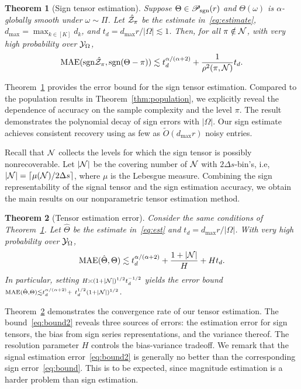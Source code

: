 \documentclass{article}
\theoremstyle{plain}
\newtheorem{thm}{Theorem}
\theoremstyle{definition}
\def\sign{\textup{sgn}}
\def\caliP{\mathscr{P}_{\textup{sgn}}}
\begin{document}
 \begin{thm}[Sign tensor estimation]\label{thm:classification} Suppose $\Theta\in\caliP(r)$ and $\Theta(\omega)$ is $\alpha$-globally smooth under $\omega\sim \Pi$. Let $\hat {\mathcal{Z}}_\pi$ be the estimate in~\eqref{eq:estimate}, $d_{\max}=\max_{k\in[K]} d_k$, and $t_d =d_{\max}r/|\Omega|\lesssim 1$. Then, for all $\pi\notin\mathcal{N}$, with very high probability over $\mathcal{Y}_\Omega$, 
\begin{align}\label{eq:bound}
\textup{MAE}(\sign \hat \tZ_\pi, \sign(\Theta-\pi)) \lesssim t_d^{\alpha/( \alpha+2)}+{1 \over \rho^2(\pi, \tN)}t_d.
\end{align}
\end{thm}
Theorem~\ref{thm:classification} provides the error bound for the sign tensor estimation. Compared to the population results in Theorem~\ref{thm:population}, we explicitly reveal the dependence of accuracy on the sample complexity and the level $\pi$. The result demonstrates the polynomial decay of sign errors with $|\Omega|$.  Our sign estimate achieves consistent recovery using as few as $\tilde O(d_{\max}r)$ noisy entries. 

Recall that $\mathcal{N}$ collects the levels for which the sign tensor is possibly nonrecoverable. Let $|\mathcal{N}|$ be the covering number of $\mathcal{N}$ with $2\Delta s$-bin's, i.e, $|\mathcal{N}| = \lceil \mu(\mathcal{N})/2\Delta s \rceil$, where $\mu$ is the Lebesgue measure. Combining the sign representability of the signal tensor and the sign estimation accuracy, we obtain the main results on our nonparametric tensor estimation method. 


\begin{thm}[Tensor estimation error]\label{thm:estimation} Consider the same conditions of Theorem~\ref{thm:classification}. Let $\hat \Theta$ be the estimate in~\eqref{eq:est} and $t_d={d_{\max}r /|\Omega|}$. With very high probability over $\mathcal{Y}_\Omega$,
\begin{equation}\label{eq:bound2}
\textup{MAE}(\hat \Theta, \Theta)\lesssim t_d^{\alpha/(\alpha+2)}+{1+|\mathcal{N}|\over H}+{Ht_d}.
\end{equation}
In particular, setting $\scriptstyle H\asymp (1+|\mathcal{N}|)^{1/2} t_d^{-1/2} $ yields the error bound $\scriptstyle \textup{MAE}(\hat \Theta, \Theta)\lesssim t_d^{{\alpha/ (\alpha+2)} }+\ t_d^{1/2}(1+|\tN|)^{1/2}$.
\end{thm}

Theorem~\ref{thm:estimation} demonstrates the convergence rate of our tensor estimation. The bound~\eqref{eq:bound2} reveals three sources of errors: the estimation error for sign tensors, the bias from sign series representations, and the variance thereof. The resolution parameter $H$ controls the bias-variance tradeoff. We remark that the signal estimation error~\eqref{eq:bound2} is generally no better than the corresponding sign error~\eqref{eq:bound}. This is to be expected, since magnitude estimation is  a harder problem than sign estimation. 
\end{document}
